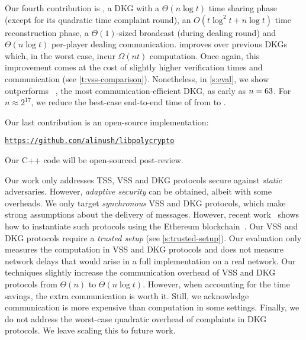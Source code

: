 \complexityTable

Our fourth contribution is \ourdkg, a DKG with a $\Theta(n\log{t})$ time sharing phase (except for its quadratic time complaint round), an $O(t\log^2{t}+n\log{t})$ time reconstruction phase, a $\Theta(1)$-sized broadcast (during dealing round) and $\Theta(n\log{t})$ per-player dealing communication.
\ourdkg improves over previous DKGs which, in the worst case, incur $\Omega(nt)$ computation.
Once again, this improvement comes at the cost of slightly higher verification times and communication (see \cref{t:vss-comparison}).
Nonetheless, in \cref{s:eval}, we show \ourdkg outperforms \ejfdkg~\cite{Kate2010Distributed}, the most communication-efficient DKG, as early as $n=63$.
For $n\approx 2^{17}$, we reduce the best-case end-to-end time of \ejfdkg from  to .

\ifCameraReady
Our last contribution is an open-source implementation:
\newcommand{\githubOrgName}{alinush}
\begin{center}
\href{https://github.com/\githubOrgName/libpolycrypto}{\texttt{\footnotesize https://github.com/\githubOrgName/libpolycrypto}}
\end{center}
\else
Our C++ code will be open-sourced post-review.
\fi

Our work only addresses TSS, VSS and DKG protocols secure against \textit{static} adversaries.
However, \textit{adaptive security} can be obtained, albeit with some overheads\cite{Canetti1999Adaptive,Feldman1987Practical,AF04,FMY99,JL00}.
We only target \textit{synchronous} VSS and DKG protocols, which make strong assumptions about the delivery of messages.
However, recent work~\cite{SJSW19} shows how to instantiate such protocols using the Ethereum blockchain~\cite{ethereum}.
Our VSS and DKG protocols require a \textit{trusted setup} (see \cref{s:trusted-setup}).
Our evaluation only measures the computation in VSS and DKG protocols and does not measure network delays that would arise in a full implementation on a real network.
Our techniques slightly increase the communication overhead of VSS and DKG protocols from $\Theta(n)$ to $\Theta(n\log{t})$.
However, when accounting for the time savings, the extra communication is worth it.
Still, we acknowledge communication is more expensive than computation in some settings.
Finally, we do not address the worst-case quadratic overhead of complaints in DKG protocols.
We leave scaling this to future work.

